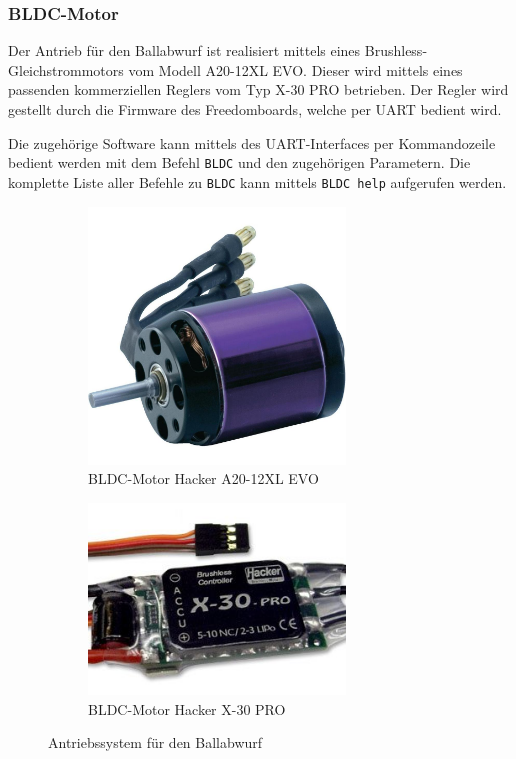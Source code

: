 \subsubsection{BLDC-Motor}
Der Antrieb für den Ballabwurf ist realisiert mittels eines
Brushless-Gleichstrommotors vom Modell A20-12XL EVO. Dieser wird
mittels eines passenden kommerziellen Reglers vom Typ X-30 PRO
betrieben. Der Regler wird gestellt durch die Firmware des
Freedomboards, welche per UART bedient wird.

Die zugehörige Software kann mittels des UART-Interfaces per
Kommandozeile bedient werden mit dem Befehl \verb!BLDC! und den
zugehörigen Parametern. Die komplette Liste aller Befehle zu
\verb!BLDC! kann mittels \verb!BLDC help! aufgerufen werden.

\begin{figure}[h!]
	\centering
	\begin{subfigure}[b]{0.45\textwidth}
		\centering
		\includegraphics[width=0.75\textwidth]{../../fig/et/a20_12xl_evo.jpg}
		\caption{BLDC-Motor Hacker A20-12XL EVO}
	\end{subfigure}
	\begin{subfigure}[b]{0.45\textwidth}
		\centering
		\includegraphics[width=0.75\textwidth]{../../fig/et/x30_pro.jpg}
		\caption{BLDC-Motor Hacker X-30 PRO}
	\end{subfigure}
	\caption{Antriebssystem für den Ballabwurf}
\end{figure}

